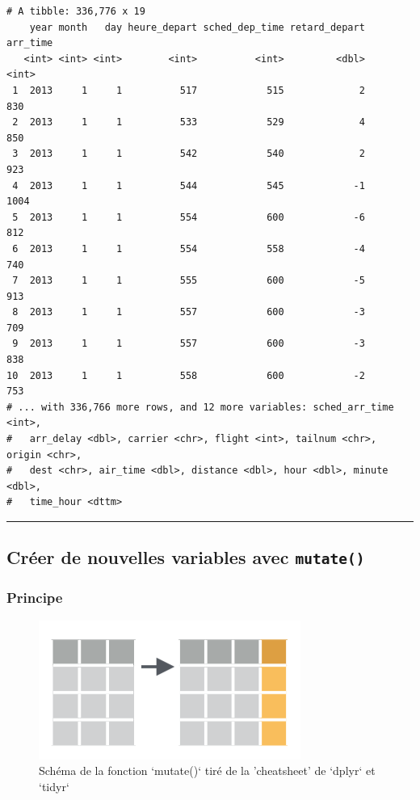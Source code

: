 \documentclass[a4paperpaper,]{article}
\theoremstyle{definition}
\theoremstyle{definition}
\theoremstyle{definition}
\theoremstyle{remark}
\begin{document}
\begin{verbatim}
# A tibble: 336,776 x 19
    year month   day heure_depart sched_dep_time retard_depart arr_time
   <int> <int> <int>        <int>          <int>         <dbl>    <int>
 1  2013     1     1          517            515             2      830
 2  2013     1     1          533            529             4      850
 3  2013     1     1          542            540             2      923
 4  2013     1     1          544            545            -1     1004
 5  2013     1     1          554            600            -6      812
 6  2013     1     1          554            558            -4      740
 7  2013     1     1          555            600            -5      913
 8  2013     1     1          557            600            -3      709
 9  2013     1     1          557            600            -3      838
10  2013     1     1          558            600            -2      753
# ... with 336,766 more rows, and 12 more variables: sched_arr_time <int>,
#   arr_delay <dbl>, carrier <chr>, flight <int>, tailnum <chr>, origin <chr>,
#   dest <chr>, air_time <dbl>, distance <dbl>, hour <dbl>, minute <dbl>,
#   time_hour <dttm>
\end{verbatim}

\begin{center}\rule{0.5\linewidth}{\linethickness}\end{center}

\subsection{\texorpdfstring{Créer de nouvelles variables avec
\texttt{mutate()}}{Créer de nouvelles variables avec mutate()}}\label{creer-de-nouvelles-variables-avec-mutate}

\subsubsection{Principe}\label{principe-1}

\begin{figure}[htpb]

{\centering \includegraphics[width=0.5\linewidth]{images/mutate} 

}

\caption{Schéma de la fonction `mutate()` tiré de la 'cheatsheet' de `dplyr` et `tidyr`}\label{fig:mutatefig}
\end{figure}
\end{document}
